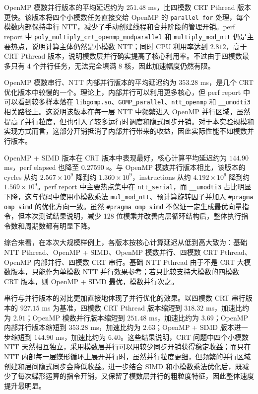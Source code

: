 \documentclass[a4paper]{article}
\begin{document}
OpenMP 模数并行版本的平均延迟约为 $251.48$ ms，比四模数 CRT Pthread 版本更快。该版本将四个小模数任务直接交给 OpenMP 的 \texttt{parallel for} 处理，每个模数内部保持串行 NTT，减少了手动创建线程和合并阶段的管理开销。perf report 中 \texttt{poly\_multiply\_crt\_openmp\_modparallel} 和 \texttt{multiply\_mod\_ntt} 仍是主要热点，说明计算主体仍然是小模数 NTT；同时 CPU 利用率达到 $2.812$，高于 CRT Pthread 版本，说明模数层并行确实提高了核心利用率。不过由于四模数最多只有 4 个并行任务，无法完全填满 8 核，因此加速幅度仍然有限。

OpenMP 模数串行、NTT 内部并行版本的平均延迟约为 $353.28$ ms，是几个 CRT 优化版本中较慢的一个。理论上，内部并行可以利用更多核心，但 perf report 中可以看到较多样本落在 \texttt{libgomp.so}、\texttt{GOMP\_parallel}、\texttt{ntt\_openmp} 和 \texttt{\_\_umodti3} 相关路径上。这说明该版本在每一层 NTT 中频繁进入 OpenMP 并行区域，虽然提高了并行粒度，但也引入了较多运行时调度和隐式同步开销。对于本实验规模和实现方式而言，这部分开销抵消了内部并行带来的收益，因此实际性能不如模数并行版本。

OpenMP + SIMD 版本在 CRT 版本中表现最好，核心计算平均延迟约为 $144.90$ ms，perf elapsed 也降至 $0.27590$ s。与 OpenMP 模数并行版本相比，该版本的 cycles 从约 $2.567\times 10^9$ 降到约 $1.360\times 10^9$，instructions 从约 $4.192\times 10^9$ 降到约 $1.569\times 10^9$。perf report 中主要热点集中在 \texttt{ntt\_serial}，而 \texttt{\_\_umodti3} 占比明显下降，这与代码中使用小模数乘法 \texttt{mul\_mod\_ntt}、预计算旋转因子并加入 \texttt{\#pragma omp simd} 的优化方向一致。虽然 \texttt{\#pragma omp simd} 不保证一定生成最优向量指令，但本次测试结果说明，减少 128 位模乘并改善内层循环结构后，整体执行指令数和周期数都有明显下降。

综合来看，在本次大规模样例上，各版本按核心计算延迟从低到高大致为：基础 NTT Pthread、OpenMP + SIMD、OpenMP 模数并行、四模数 CRT Pthread、OpenMP 内部并行、四模数 CRT 串行。基础 NTT Pthread 由于不是 CRT 大模数版本，只能作为单模数 NTT 并行效果参考；若只比较支持大模数的四模数 CRT 版本，则 OpenMP + SIMD 最优，模数并行次之。

串行与并行版本的对比更加直接地体现了并行优化的效果。以四模数 CRT 串行版本的 $927.15$ ms 为基准，四模数 CRT Pthread 版本缩短到 $318.32$ ms，加速比约为 $2.91$；OpenMP 模数并行版本缩短到 $251.48$ ms，加速比约为 $3.69$；OpenMP 内部并行版本缩短到 $353.28$ ms，加速比约为 $2.63$；OpenMP + SIMD 版本进一步缩短到 $144.90$ ms，加速比约为 $6.40$。这些结果说明，CRT 问题中四个小模数 NTT 天然相互独立，采用模数层并行可以用较少同步开销获得稳定收益；而只在 NTT 内部每一层蝶形循环上展开并行时，虽然并行粒度更细，但频繁的并行区域创建和层间隐式同步会降低收益。进一步结合 SIMD 和小模数乘法优化后，既减少了每次蝶形运算的指令开销，又保留了模数层并行的粗粒度特征，因此整体速度提升最明显。
\end{document}
